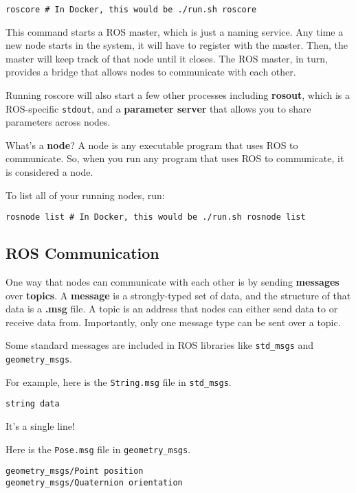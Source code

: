 \begin{lstlisting}
roscore # In Docker, this would be ./run.sh roscore
\end{lstlisting}
This command starts a ROS master, which is just a naming service. Any time a new node starts in the system, it will have to register with the master. Then, the master will keep track of that node until it closes. The ROS master, in turn, provides a bridge that allows nodes to communicate with each other.

Running roscore will also start a few other processes including \textbf{rosout}, which is a ROS-specific \texttt{stdout}, and a \textbf{parameter server} that allows you to share parameters across nodes.   

What's a \textbf{node}? A node is any executable program that uses ROS to communicate. So, when you run any program that uses ROS to communicate, it is considered a node.

To list all of your running nodes, run:

\begin{lstlisting}
rosnode list # In Docker, this would be ./run.sh rosnode list
\end{lstlisting}

\subsection{ROS Communication}
One way that nodes can communicate with each other is by sending \textbf{messages} over \textbf{topics}. A \textbf{message} is a strongly-typed set of data, and the structure of that data is a \textbf{.msg} file. A topic is an address that nodes can either send data to or receive data from. Importantly, only one message type can be sent over a topic. 

Some standard messages are included in ROS libraries like \texttt{std\_msgs} and \texttt{geometry\_msgs}.

For example, here is the \texttt{String.msg} file in \texttt{std\_msgs}.

\begin{lstlisting}
string data
\end{lstlisting}


It's a single line!

Here is the \texttt{Pose.msg} file in \texttt{geometry\_msgs}.


\begin{lstlisting}
geometry_msgs/Point position
geometry_msgs/Quaternion orientation
\end{lstlisting}

